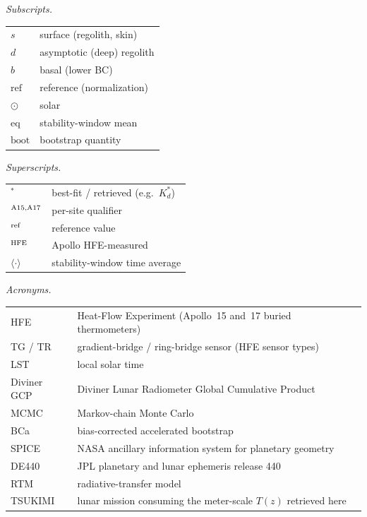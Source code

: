 \documentclass[11pt]{article}
\begin{document}
{\medskip
\noindent\begin{minipage}[t]{0.49\linewidth}
\textit{Subscripts.}\par\smallskip
\begin{tabular}{@{}ll@{}}
\toprule
$s$            & surface (regolith, skin) \\
$d$            & asymptotic (deep) regolith  \\
$b$            & basal (lower BC) \\
$\mathrm{ref}$ & reference (normalization) \\
$\odot$        & solar \\
$\mathrm{eq}$  & stability-window mean \\
$\mathrm{boot}$ & bootstrap quantity \\
\bottomrule
\end{tabular}
\end{minipage}\hfill
\begin{minipage}[t]{0.49\linewidth}
\textit{Superscripts.}\par\smallskip
\begin{tabular}{@{}ll@{}}
\toprule
$^{*}$            & best-fit / retrieved (e.g.\ $K_d^{*}$) \\
$^{\rm A15,A17}$  & per-site qualifier \\
$^{\rm ref}$      & reference value \\
$^{\rm HFE}$      & Apollo HFE-measured \\
$\langle\cdot\rangle$ & stability-window time average \\
\bottomrule
\end{tabular}
\end{minipage}

\medskip
\noindent\textit{Acronyms.}\par\smallskip\noindent
\begin{tabular}{@{}ll@{}}
\toprule
HFE          & Heat-Flow Experiment (Apollo~15 and~17 buried thermometers) \\
TG / TR      & gradient-bridge / ring-bridge sensor (HFE sensor types) \\
LST          & local solar time \\
Diviner GCP  & Diviner Lunar Radiometer Global Cumulative Product \\
MCMC         & Markov-chain Monte Carlo \\
BCa          & bias-corrected accelerated bootstrap \\
SPICE        & NASA ancillary information system for planetary geometry \\
DE440        & JPL planetary and lunar ephemeris release 440 \\
RTM          & radiative-transfer model \\
TSUKIMI      & lunar mission consuming the meter-scale $T(z)$ retrieved here \\
\bottomrule
\end{tabular}
}


\end{document}
